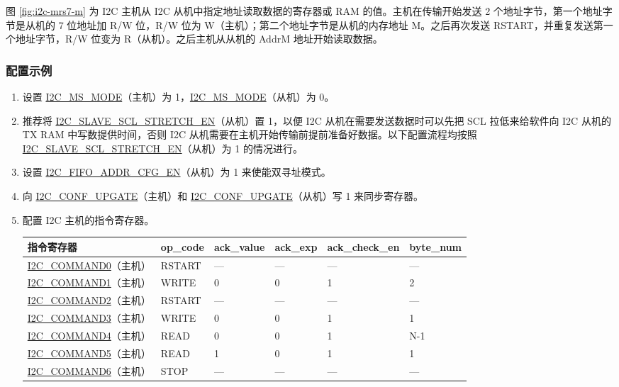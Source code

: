 \documentclass[main\_\_CN.tex]{subfiles}
\begin{document}
图 \ref{fig:i2c-mrs7-m} 为 I2C 主机从 I2C 从机中指定地址读取数据的寄存器或 RAM 的值。主机在传输开始发送 2 个地址字节，第一个地址字节是从机的 7 位地址加 R/W 位，R/W 位为 W（主机）；第二个地址字节是从机的内存地址 M。之后再次发送 RSTART，并重复发送第一个地址字节，R/W 位变为 R（从机）。之后主机从从机的 AddrM 地址开始读取数据。

\subsubsection{配置示例}

\begin{enumerate}
\item 设置 \hyperref[fielddesc:I2CMSMODE]{I2C\_MS\_MODE}（主机）为 1，\hyperref[fielddesc:I2CMSMODE]{I2C\_MS\_MODE}（从机）为 0。
\item 推荐将 \hyperref[fielddesc:I2CSLAVESCLSTRETCHEN]{I2C\_SLAVE\_SCL\_STRETCH\_EN}（从机）置 1，以便 I2C 从机在需要发送数据时可以先把 SCL 拉低来给软件向 I2C 从机的 TX RAM 中写数提供时间，否则 I2C 从机需要在主机开始传输前提前准备好数据。以下配置流程均按照\hyperref[fielddesc:I2CSLAVESCLSTRETCHEN]{I2C\_SLAVE\_SCL\_STRETCH\_EN}（从机）为 1 的情况进行。
\item 设置 \hyperref[fielddesc:I2CFIFOADDRCFGEN]{I2C\_FIFO\_ADDR\_CFG\_EN}（从机）为 1 来使能双寻址模式。
\item 向 \hyperref[fielddesc:I2CCONFUPGATE]{I2C\_CONF\_UPGATE}（主机）和 \hyperref[fielddesc:I2CCONFUPGATE]{I2C\_CONF\_UPGATE}（从机）写 1 来同步寄存器。
\item 配置 I2C 主机的指令寄存器。

\begin{longtable}{ | p{4cm} | p{2cm} | p{2cm} | p{2cm} |p{2cm} | p{2cm} |}
\hline\rowcolor{lightgray}
指令寄存器& op\_code & ack\_value&ack\_exp&ack\_check\_en&byte\_num  \\ \hline
\hyperref[fielddesc:I2CCOMMAND0]{I2C\_COMMAND0}（主机）& RSTART& ---&---&---&---  \\ \hline
\hyperref[fielddesc:I2CCOMMAND1]{I2C\_COMMAND1}（主机）& WRITE& 0&0&1&2  \\ \hline
\hyperref[fielddesc:I2CCOMMAND2]{I2C\_COMMAND2}（主机）& RSTART& ---&---&---&---  \\ \hline
\hyperref[fielddesc:I2CCOMMAND3]{I2C\_COMMAND3}（主机）& WRITE& 0&0&1&1  \\ \hline
\hyperref[fielddesc:I2CCOMMAND4]{I2C\_COMMAND4}（主机）& READ& 0&0&1&N-1  \\ \hline
\hyperref[fielddesc:I2CCOMMAND5]{I2C\_COMMAND5}（主机）& READ& 1&0&1&1  \\ \hline
\hyperref[fielddesc:I2CCOMMAND6]{I2C\_COMMAND6}（主机）& STOP& ---&---&---&---  \\ \hline
\end{longtable}


\end{enumerate}
\end{document}
